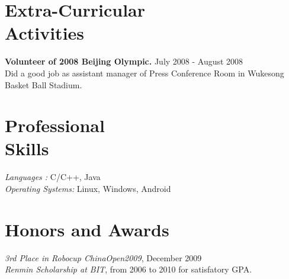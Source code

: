 \documentclass[margin]{res}
\begin{document}
\begin{resume}
\section{Extra-Curricular \\ Activities} 
				{ \bf Volunteer of 2008 Beijing Olympic.} \hfill July 2008 - August 2008 \\  		
                 Did a good job as assistant manager of Press Conference Room in Wukesong Basket Ball Stadium.

\section{Professional \\ Skills} {\sl Languages :} C/C++, Java\\
                {\sl Operating Systems:} Linux, Windows, Android

\section{Honors and Awards }             
             {\it 3rd Place in Robocup ChinaOpen2009}, 	December	2009 \\             			
			 {\it Renmin Scholarship at BIT}, from 2006 to 2010 for satisfatory GPA.			  				

\end{resume}
\end{document}
